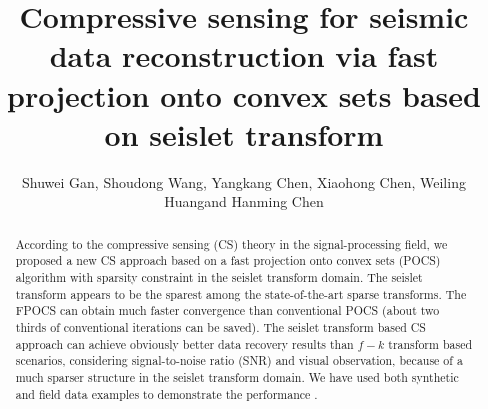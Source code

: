 
\title{Compressive sensing for seismic data reconstruction via fast projection onto convex sets based on seislet transform}
\renewcommand{\thefootnote}{\fnsymbol{footnote}}
\author{Shuwei Gan\footnotemark[1], Shoudong Wang\footnotemark[1], Yangkang Chen\footnotemark[2], Xiaohong Chen\footnotemark[1], Weiling Huang\footnotemark[1] and Hanming Chen\footnotemark[1]}
\address{
\footnotemark[1] State Key Laboratory of Petroleum Resources and Prospecting \\
China University of Petroleum \\
Fuxue Road 18th\\
Beijing, China, 102200 \\
Email: gsw19900128@126.com\&swang104@ucsc.edu\&chenxh@cup.edu.cn \\
cup\_hwl@126.com \& huichanming@126.com \\
\footnotemark[2] Jackson School of Geosciences\\
The University of Texas at Austin\\
University Station, Box X\\
Austin, TX 78713-8924, USA \\
Email: ykchen@utexas.edu
}


\begin{abstract}
According to the compressive sensing (CS) theory in the signal-processing field, we proposed a new CS approach based on a fast projection onto convex sets (POCS) algorithm with sparsity constraint in the seislet transform domain. The seislet transform appears to be the sparest among the state-of-the-art sparse transforms. The FPOCS can obtain much faster convergence than conventional POCS (about two thirds of conventional iterations can be saved).  The seislet transform based CS approach can achieve obviously better data recovery results than $f-k$ transform based scenarios, considering  signal-to-noise ratio (SNR) and visual observation, because of a much sparser structure in the seislet transform domain. We have used both synthetic and field data examples to demonstrate the  performance . 
\end{abstract}


